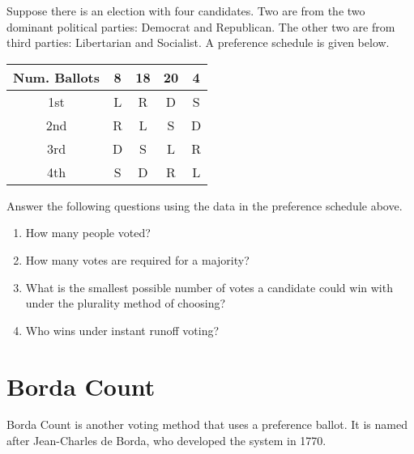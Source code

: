 \newpage

\begin{exercise}
  Suppose there is an election with four candidates. Two are from the
  two dominant political parties: Democrat and Republican. The other
  two are from third parties: Libertarian and Socialist. A preference
  schedule is given below.
  \begin{center}
    \begin{tabular}{ccccc}
      \toprule
      Num. Ballots & 8 & 18 & 20 & 4 \\
      \midrule
      1st & L & R & D & S \\
      2nd & R & L & S & D \\
      3rd & D & S & L & R \\
      4th & S & D & R & L \\
      \bottomrule
    \end{tabular}
  \end{center}
  Answer the following questions using the data in the preference
  schedule above.
  \begin{enumerate}
  \item How many people voted?


  \item How many votes are required for a majority?


  \item What is the smallest possible number of votes a candidate
    could win with under the plurality method of choosing?



  \item Who wins under instant runoff voting?

  \end{enumerate}
\end{exercise}

\newpage

\section{Borda Count}%
\label{sec:borda-count}

Borda Count is another voting method that uses a preference ballot. It
is named after Jean-Charles de Borda, who developed the system in
1770.

